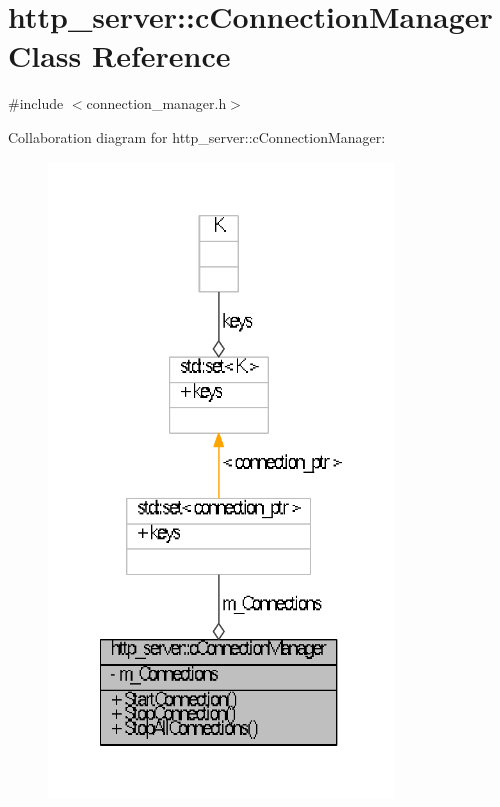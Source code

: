\hypertarget{classhttp__server_1_1cConnectionManager}{\section{http\-\_\-server\-:\-:c\-Connection\-Manager \-Class \-Reference}
\label{classhttp__server_1_1cConnectionManager}
}


{\ttfamily \#include $<$connection\-\_\-manager.\-h$>$}



\-Collaboration diagram for http\-\_\-server\-:\-:c\-Connection\-Manager\-:\nopagebreak
\begin{figure}[H]
\begin{center}
\leavevmode
\includegraphics[width=260pt]{classhttp__server_1_1cConnectionManager__coll__graph}
\end{center}
\end{figure}
